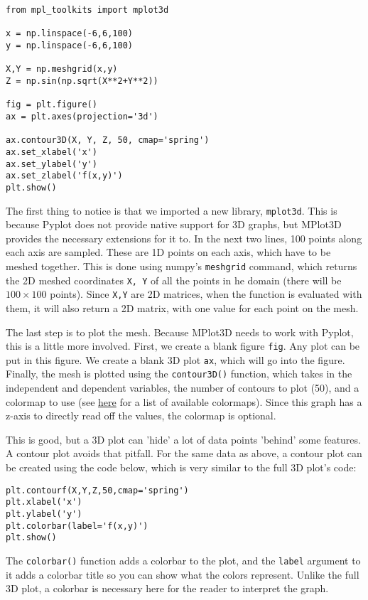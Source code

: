 \documentclass[12pt]{article}
\newcommand{\code}{\texttt}
\begin{document}
\begin{lstlisting}[frame=single] 
from mpl_toolkits import mplot3d

x = np.linspace(-6,6,100)
y = np.linspace(-6,6,100)

X,Y = np.meshgrid(x,y)
Z = np.sin(np.sqrt(X**2+Y**2))

fig = plt.figure()
ax = plt.axes(projection='3d')

ax.contour3D(X, Y, Z, 50, cmap='spring')
ax.set_xlabel('x')
ax.set_ylabel('y')
ax.set_zlabel('f(x,y)')
plt.show()
\end{lstlisting}

The first thing to notice is that we imported a new library, \code{mplot3d}. This is because Pyplot does not provide native support for 3D graphs, but MPlot3D provides the necessary extensions for it to. In the next two lines, 100 points along each axis are sampled. These are 1D points on each axis, which have to be meshed together. This is done using numpy's \code{meshgrid} command, which returns the 2D meshed coordinates \code{X, Y} of all the points in he domain (there will be $100 \times 100$ points). Since \code{X,Y} are 2D matrices, when the function is evaluated with them, it will also return a 2D matrix, with one value for each point on the mesh.

The last step is to plot the mesh. Because MPlot3D needs to work with Pyplot, this is a little more involved. First, we create a blank figure \code{fig}. Any plot can be put in this figure. We create a blank 3D plot \code{ax}, which will go into the figure. Finally, the mesh is plotted using the \code{contour3D()} function, which takes in the independent and dependent variables, the number of contours to plot (50), and a colormap to use (see \href{https://matplotlib.org/tutorials/colors/colormaps.html}{here} for a list of available colormaps). Since this graph has a z-axis to directly read off the values, the colormap is optional.

This is good, but a 3D plot can 'hide' a lot of data points 'behind' some features. A contour plot avoids that pitfall. For the same data as above, a contour plot can be created using the code below, which is very similar to the full 3D plot's code:

\begin{lstlisting}[frame=single] 
plt.contourf(X,Y,Z,50,cmap='spring')
plt.xlabel('x')
plt.ylabel('y')
plt.colorbar(label='f(x,y)')
plt.show()
\end{lstlisting}

The \code{colorbar()} function adds a colorbar to the plot, and the \code{label} argument to it adds a colorbar title so you can show what the colors represent. Unlike the full 3D plot, a colorbar is necessary here for the reader to interpret the graph.
\end{document}
